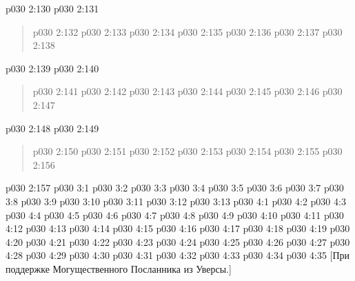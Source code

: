 \vsetspace
\vs p030 2:130 \pc 
\vsetspace
\vs p030 2:131 
\begin{quote}
\vs p030 2:132 
\vs p030 2:133 
\vs p030 2:134 
\vs p030 2:135 
\vs p030 2:136 
\vs p030 2:137 
\vs p030 2:138 
\end{quote}
\vs p030 2:139 \pc 
\vsetspace
\vs p030 2:140 
\begin{quote}
\vs p030 2:141 
\vs p030 2:142 
\vs p030 2:143 
\vs p030 2:144 
\vs p030 2:145 
\vs p030 2:146 
\vs p030 2:147 
\end{quote}
\vs p030 2:148 \pc 
\vsetspace
\vs p030 2:149 
\begin{quote}
\vs p030 2:150 
\vs p030 2:151 
\vs p030 2:152 
\vs p030 2:153 
\vs p030 2:154 
\vs p030 2:155 
\vs p030 2:156 
\end{quote}
\vs p030 2:157 \pc 
{}
\vs p030 3:1 
\vs p030 3:2 
\vs p030 3:3 
\vs p030 3:4 
\vs p030 3:5 
\vs p030 3:6 
\vs p030 3:7 
\vs p030 3:8 
\vs p030 3:9 
\vs p030 3:10 
\vs p030 3:11 
\vs p030 3:12 
\vs p030 3:13 
\vs p030 4:1 
\vs p030 4:2 
\vs p030 4:3 
\vs p030 4:4 
\vs p030 4:5 
\vs p030 4:6 
\vs p030 4:7 
\vs p030 4:8 
\vs p030 4:9 \pc 
\vs p030 4:10 
\vs p030 4:11 
\vs p030 4:12 
\vs p030 4:13 
\vs p030 4:14 
\vs p030 4:15 
\vs p030 4:16 \pc 
\vs p030 4:17 
\vs p030 4:18 
\vs p030 4:19 
\vs p030 4:20 
\vs p030 4:21 
\vs p030 4:22 
\vs p030 4:23 
\vs p030 4:24 
\vs p030 4:25 
\vs p030 4:26 
\vs p030 4:27 
\vs p030 4:28 
\vs p030 4:29 
\vs p030 4:30 
\vs p030 4:31 
\vs p030 4:32 
\vs p030 4:33 
\vs p030 4:34 \pc 
\vsetoff
\vs p030 4:35 [При поддержке Могущественного Посланника из Уверсы.]
\quizlink
